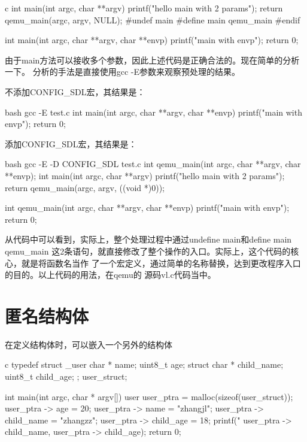 \begin{outline}[enumerate]
\begin{code-in-enumerate}{c}
int main(int argc, char **argv)
{
    printf("hello main with 2 params\n");
    return qemu_main(argc, argv, NULL);
}
#undef main
#define main qemu_main
#endif

int main(int argc, char **argv, char **envp)
{
    printf("main with envp\n");
    return 0;
}
\end{code-in-enumerate}
\par{} \linewidth\textwidth
\setlength{\parindent}{2em}
由于main方法可以接收多个参数，因此上述代码是正确合法的。现在简单的分析一下。
分析的手法是直接使用gcc -E参数来观察预处理的结果。

\setlength{\parindent}{2em}
不添加CONFIG\_SDL宏，其结果是：
\begin{code-in-enumerate}{bash}
gcc -E test.c
int main(int argc, char **argv, char **envp)
{
    printf("main with envp\n");
    return 0;
}
\end{code-in-enumerate}
\par{} \linewidth\textwidth
\setlength{\parindent}{2em}
添加CONFIG\_SDL宏，其结果是：
\begin{code-in-enumerate}{bash}
gcc -E -D CONFIG_SDL test.c
int qemu_main(int argc, char **argv, char **envp);
int main(int argc, char **argv)
{
    printf("hello main with 2 params\n");
    return qemu_main(argc, argv, ((void *)0));
}

int qemu_main(int argc, char **argv, char **envp)
{
    printf("main with envp\n");
    return 0;
}
\end{code-in-enumerate}
\par{} \linewidth\textwidth
\setlength{\parindent}{2em}
从代码中可以看到，实际上，整个处理过程中通过undefine main和define main qemu\_main
这2条语句，就直接修改了整个操作的入口。实际上，这个代码的核心，就是将函数名当作
了一个宏定义，通过简单的名称替换，达到更改程序入口的目的。以上代码的用法，在qemu的
源码vl.c代码当中。
\end{outline}

\section{匿名结构体}
在定义结构体时，可以嵌入一个另外的结构体
\begin{code-block}{c}
typedef struct _user {
    char * name;
    uint8_t age;
    struct {
        char * child_name;
        uint8_t child_age;
    };
}user_struct;

int main(int argc, char * argv[])
{
    user user_ptra = malloc(sizeof(user_struct));
    user_ptra -> age = 20;
    user_ptra -> name = "zhangjl";
    user_ptra -> child_name = "zhangzz";
    user_ptra -> child_age = 18;
    printf("%
           user_ptra -> child_name, user_ptra -> child_age);
    return 0;
}
\end{code-block}

